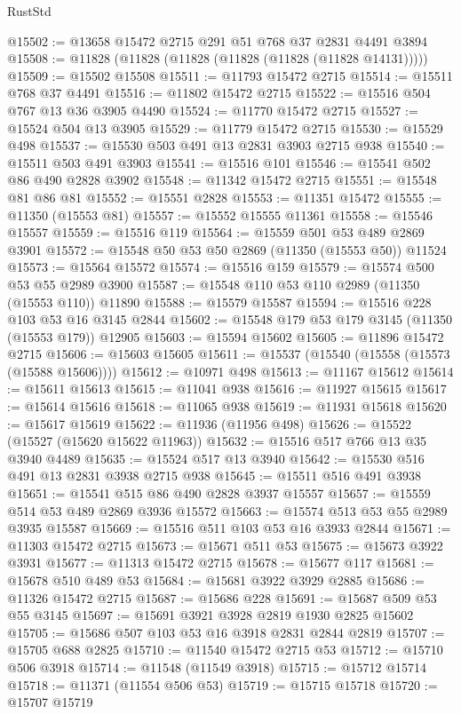 \begin{lexlean}{RustStd}
\begin{coremodule}
{\begin{coremodule}
{{{{{{{{{{{{{{{{{{{{{{{{{{{{{{{{{@15502 := @13658 @15472 @2715 @291 @51 @768 @37 @2831 @4491 @3894
@15508 := @11828 (@11828 (@11828 (@11828 (@11828 (@11828 @14131)))))
@15509 := @15502 @15508
@15511 := @11793 @15472 @2715
@15514 := @15511 @768 @37 @4491
@15516 := @11802 @15472 @2715
@15522 := @15516 @504 @767 @13 @36 @3905 @4490
@15524 := @11770 @15472 @2715
@15527 := @15524 @504 @13 @3905
@15529 := @11779 @15472 @2715
@15530 := @15529 @498
@15537 := @15530 @503 @491 @13 @2831 @3903 @2715 @938
@15540 := @15511 @503 @491 @3903
@15541 := @15516 @101
@15546 := @15541 @502 @86 @490 @2828 @3902
@15548 := @11342 @15472 @2715
@15551 := @15548 @81 @86 @81
@15552 := @15551 @2828
@15553 := @11351 @15472
@15555 := @11350 (@15553 @81)
@15557 := @15552 @15555 @11361
@15558 := @15546 @15557
@15559 := @15516 @119
@15564 := @15559 @501 @53 @489 @2869 @3901
@15572 := @15548 @50 @53 @50 @2869 (@11350 (@15553 @50)) @11524
@15573 := @15564 @15572
@15574 := @15516 @159
@15579 := @15574 @500 @53 @55 @2989 @3900
@15587 := @15548 @110 @53 @110 @2989 (@11350 (@15553 @110)) @11890
@15588 := @15579 @15587
@15594 := @15516 @228 @103 @53 @16 @3145 @2844
@15602 := @15548 @179 @53 @179 @3145 (@11350 (@15553 @179)) @12905
@15603 := @15594 @15602
@15605 := @11896 @15472 @2715
@15606 := @15603 @15605
@15611 := @15537 (@15540 (@15558 (@15573 (@15588 @15606))))
@15612 := @10971 @498
@15613 := @11167 @15612
@15614 := @15611 @15613
@15615 := @11041 @938
@15616 := @11927 @15615
@15617 := @15614 @15616
@15618 := @11065 @938
@15619 := @11931 @15618
@15620 := @15617 @15619
@15622 := @11936 (@11956 @498)
@15626 := @15522 (@15527 (@15620 @15622 @11963))
@15632 := @15516 @517 @766 @13 @35 @3940 @4489
@15635 := @15524 @517 @13 @3940
@15642 := @15530 @516 @491 @13 @2831 @3938 @2715 @938
@15645 := @15511 @516 @491 @3938
@15651 := @15541 @515 @86 @490 @2828 @3937 @15557
@15657 := @15559 @514 @53 @489 @2869 @3936 @15572
@15663 := @15574 @513 @53 @55 @2989 @3935 @15587
@15669 := @15516 @511 @103 @53 @16 @3933 @2844
@15671 := @11303 @15472 @2715
@15673 := @15671 @511 @53
@15675 := @15673 @3922 @3931
@15677 := @11313 @15472 @2715
@15678 := @15677 @117
@15681 := @15678 @510 @489 @53
@15684 := @15681 @3922 @3929 @2885
@15686 := @11326 @15472 @2715
@15687 := @15686 @228
@15691 := @15687 @509 @53 @55 @3145
@15697 := @15691 @3921 @3928 @2819 @1930 @2825 @15602
@15705 := @15686 @507 @103 @53 @16 @3918 @2831 @2844 @2819
@15707 := @15705 @688 @2825
@15710 := @11540 @15472 @2715 @53
@15712 := @15710 @506 @3918
@15714 := @11548 (@11549 @3918)
@15715 := @15712 @15714
@15718 := @11371 (@11554 @506 @53)
@15719 := @15715 @15718
@15720 := @15707 @15719
}}}}}}}}}}}}}}}}}}}}}}}}}}}}}}}}}
\end{coremodule}}
\end{coremodule}
\end{lexlean}
